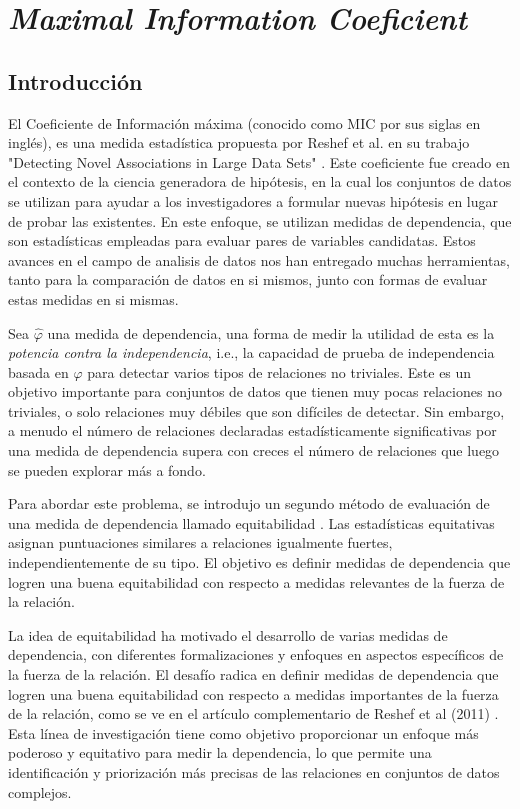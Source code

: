 \chapter{\textit{Maximal Information Coeficient}}\label{chap2}

\section{Introducci\'on}

El Coeficiente de Informaci\'on m\'axima (conocido como MIC por sus siglas en ingl\'es), es una medida estad\'istica propuesta por Reshef et al. en su trabajo "Detecting Novel Associations in Large Data Sets" \cite{Reshef2011}. Este coeficiente fue creado en el contexto de la ciencia generadora de hip\'otesis, en la cual los conjuntos de datos se utilizan para ayudar a los investigadores a formular nuevas hip\'otesis en lugar de probar las existentes. En este enfoque, se utilizan medidas de dependencia, que son estad\'isticas empleadas para evaluar pares de variables candidatas. Estos avances en el campo de analisis de datos nos han entregado muchas herramientas, tanto para la comparaci\'on de datos en si mismos, junto con formas de evaluar estas medidas en si mismas.

Sea $\hat\varphi$ una medida de dependencia, una forma de medir la utilidad de esta es la \textit{potencia contra la independencia}, i.e., la capacidad de prueba de independencia basada en $\hat\varphi$ para detectar varios tipos de relaciones no triviales. Este es un objetivo importante para conjuntos de datos que tienen muy pocas relaciones no triviales, o solo relaciones muy d\'ebiles que son dif\'iciles de detectar. Sin embargo, a menudo el n\'umero de relaciones declaradas estad\'isticamente significativas por una medida de dependencia supera con creces el n\'umero de relaciones que luego se pueden explorar m\'as a fondo.

Para abordar este problema, se introdujo un segundo m\'etodo de evaluaci\'on de una medida de dependencia llamado equitabilidad \cite{Reshef2011}. Las estad\'isticas equitativas asignan puntuaciones similares a relaciones igualmente fuertes, independientemente de su tipo. El objetivo es definir medidas de dependencia que logren una buena equitabilidad con respecto a medidas relevantes de la fuerza de la relaci\'on. 

La idea de equitabilidad ha motivado el desarrollo de varias medidas de dependencia, con diferentes formalizaciones y enfoques en aspectos espec\'ificos de la fuerza de la relaci\'on. El desaf\'io radica en definir medidas de dependencia que logren una buena equitabilidad con respecto a medidas importantes de la fuerza de la relaci\'on, como se ve en el art\'iculo complementario de Reshef et al (2011) \cite{Reshef2011}. Esta l\'inea de investigaci\'on tiene como objetivo proporcionar un enfoque m\'as poderoso y equitativo para medir la dependencia, lo que permite una identificaci\'on y priorizaci\'on m\'as precisas de las relaciones en conjuntos de datos complejos.

